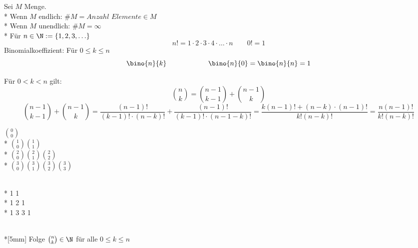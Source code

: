 %
\wdh
Sei $M$ Menge.\\*
Wenn $M$ endlich: $\#M=Anzahl$ $Elemente\in M$\\*
Wenn $M$ unendlich: $\#M=\infty$\\*
Für $n\in \N:=\{1,2,3,\ldots\}$
$$n!=1 · 2 · 3 · 4 · … · n \qquad 0!=1$$
Binomialkoeffizient: Für $0\leq k\leq n$
$$\bino{n}{k} \qquad\qquad\qquad \bino{n}{0}=\bino{n}{n}=1$$

Für $0<k< n$ gilt:
$$\binom{n}{k} = \binom{n -1}{k-1} + \binom{n-1}{k}$$
%
\bew 
$$\binom{n-1}{k-1}+ \binom{n-1}{k}=\frac{(n-1)!}{(k-1)!·(n-k)!} +\frac{(n-1)!}{(k-1)!·(n-1-k)!} = \frac{k(n-1)!+(n-k)\cdot(n-1)!}{k! (n-k)!}=\frac{n(n-1)!}{k!(n-k)!}$$

\parbox{0.4\textwidth}{\centering
$\binom{0}{0}$\\*
$\binom{1}{0} \binom{1}{1}$\\*
$\binom{2}{0} \binom{2}{1} \binom{2}{2}$\\*
$\binom{3}{0} \binom{3}{1} \binom{3}{2} \binom{3}{3}$}\hfill
\parbox{0.4\textwidth}{\\*
1 1\\*
1 2 1\\*
1 3 3 1}\\*[5mm]
Folge $\binom{n}{k}\in \N$ für alle $0\leq k\leq n$

